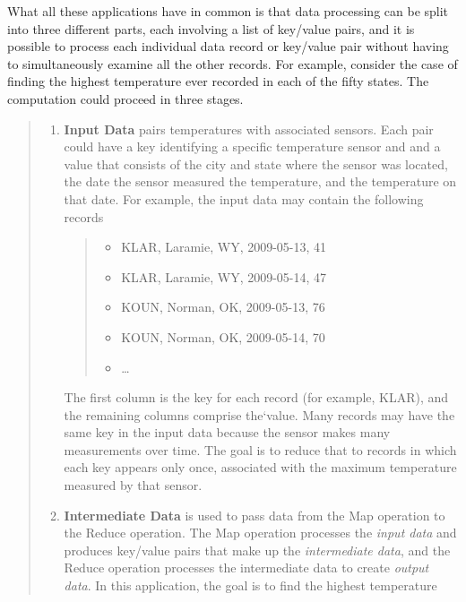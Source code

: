 What all these applications have in common is that data processing
can be split into three different parts, each involving a list of
key/value pairs, and it is possible to process each individual
data record or key/value pair without having to simultaneously
examine all the other records.  For
example, consider the case of finding the highest
temperature ever recorded in each of the fifty states.
The computation could proceed in three stages.
\begin{quote}
\begin{enumerate}
    \item \textbf{Input Data} pairs temperatures with associated sensors.
        Each pair could have a key identifying a
        specific temperature sensor and
        and a value that consists of the city and state where
        the sensor was located, the date the sensor measured
        the temperature, and the temperature on that date.
        For example, the input data may contain the following
        records
        \begin {quote}
        \begin{itemize}
            \item \textsf{KLAR, Laramie, WY, 2009-05-13, 41}
            \item \textsf{KLAR, Laramie, WY, 2009-05-14, 47}
            \item \textsf{KOUN, Norman,  OK, 2009-05-13, 76}
            \item \textsf{KOUN, Norman,  OK, 2009-05-14, 70}
            \item \dots
        \end{itemize}
        \end{quote}
        The first column is the key for each record (for example, KLAR),
        and the remaining columns comprise the`value. Many
        records may have the same key in the input data because the
        sensor makes many measurements over time.
        The goal is to reduce that to records
        in which each key appears only once,
        associated with the maximum temperature measured by that sensor.
    \item \textbf{Intermediate Data} is used to pass data from
        the Map operation to the Reduce operation. The Map operation
        processes the \emph{input data} and produces key/value pairs
        that make up the \emph{intermediate data}, and the Reduce operation
        processes the intermediate data to create \emph{output data}.
        In this application, the goal is to find the highest temperature

\end{enumerate}
\end{quote}
